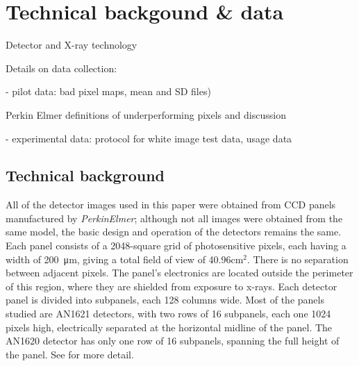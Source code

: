 \documentclass[\main/IO-Pixels.tex]{subfiles}
\begin{document}
 
 
\section{Technical backgound \& data}
\begin{outline}
Detector and X-ray technology

Details on data collection: 

- pilot data: bad pixel maps, mean and SD files)

  Perkin Elmer definitions of underperforming pixels and discussion
  
- experimental data: protocol for white image test data, usage data
\end{outline}

\subsection{Technical background}

All of the detector images used in this paper were obtained from CCD panels manufactured by \textit{PerkinElmer}; although not all images were obtained from the same model, the basic design and operation of the detectors remains the same. Each panel consists of a 2048-square grid of photosensitive pixels, each having a width of \SI{200}{\micro\meter}, giving a total field of view of 40.96cm$^2$. There is no separation between adjacent pixels. The panel's electronics are located outside the perimeter of this region, where they are shielded from exposure to x-rays. Each detector panel is divided into subpanels, each 128 columns wide. Most of the panels studied are AN1621 detectors, with two rows of 16 subpanels, each one 1024 pixels high, electrically separated at the horizontal midline of the panel. The AN1620 detector has only one row of 16 subpanels, spanning the full height of the panel. See \cite{PerkinElmerManual} for more detail.
\end{document}
